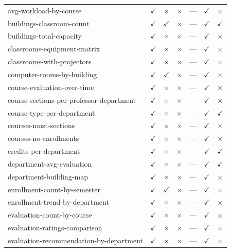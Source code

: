 \begin{longtable}{lcccccc}
avg-workload-by-course & $\checkmark$ & $\times$ & $\times$ & --- & $\checkmark$ & $\times$ \\
buildings-classroom-count & $\checkmark$ & $\checkmark$ & $\times$ & --- & $\checkmark$ & $\checkmark$ \\
buildings-total-capacity & $\checkmark$ & $\times$ & $\times$ & --- & $\checkmark$ & $\times$ \\
classrooms-equipment-matrix & $\checkmark$ & $\times$ & $\times$ & --- & $\checkmark$ & $\times$ \\
classrooms-with-projectors & $\checkmark$ & $\times$ & $\times$ & --- & $\checkmark$ & $\times$ \\
computer-rooms-by-building & $\checkmark$ & $\checkmark$ & $\times$ & --- & $\checkmark$ & $\times$ \\
course-evaluation-over-time & $\checkmark$ & $\times$ & $\times$ & --- & $\checkmark$ & $\times$ \\
course-sections-per-professor-department & $\checkmark$ & $\times$ & $\times$ & --- & $\checkmark$ & $\times$ \\
course-type-per-department & $\checkmark$ & $\times$ & $\times$ & --- & $\checkmark$ & $\checkmark$ \\
courses-most-sections & $\checkmark$ & $\times$ & $\times$ & --- & $\checkmark$ & $\times$ \\
courses-no-enrollments & $\checkmark$ & $\times$ & $\times$ & --- & $\checkmark$ & $\times$ \\
credits-per-department & $\checkmark$ & $\times$ & $\times$ & --- & $\checkmark$ & $\checkmark$ \\
department-avg-evaluation & $\checkmark$ & $\times$ & $\times$ & --- & $\checkmark$ & $\checkmark$ \\
department-building-map & $\checkmark$ & $\times$ & $\times$ & --- & $\checkmark$ & $\times$ \\
enrollment-count-by-semester & $\checkmark$ & $\checkmark$ & $\times$ & --- & $\checkmark$ & $\times$ \\
enrollment-trend-by-department & $\checkmark$ & $\times$ & $\times$ & --- & $\checkmark$ & $\times$ \\
evaluation-count-by-course & $\checkmark$ & $\times$ & $\times$ & --- & $\checkmark$ & $\times$ \\
evaluation-ratings-comparison & $\checkmark$ & $\times$ & $\times$ & --- & $\checkmark$ & $\times$ \\
evaluation-recommendation-by-department & $\checkmark$ & $\times$ & $\times$ & --- & $\checkmark$ & $\times$ \\

\end{longtable}
